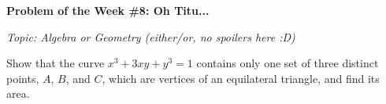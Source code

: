 \begin{potw}\vspace{5pt}
{\large\textbf{Problem of the Week \#8: Oh Titu...}}\vspace{5pt}

\textit{Topic: Algebra or Geometry (either/or, no spoilers here :D)}\V

Show that the curve $x^3 + 3xy + y^3 = 1$ contains only one set of three
distinct points, $A$, $B$, and $C$, which are vertices of an equilateral
triangle, and find its area.
\end{potw}\V
